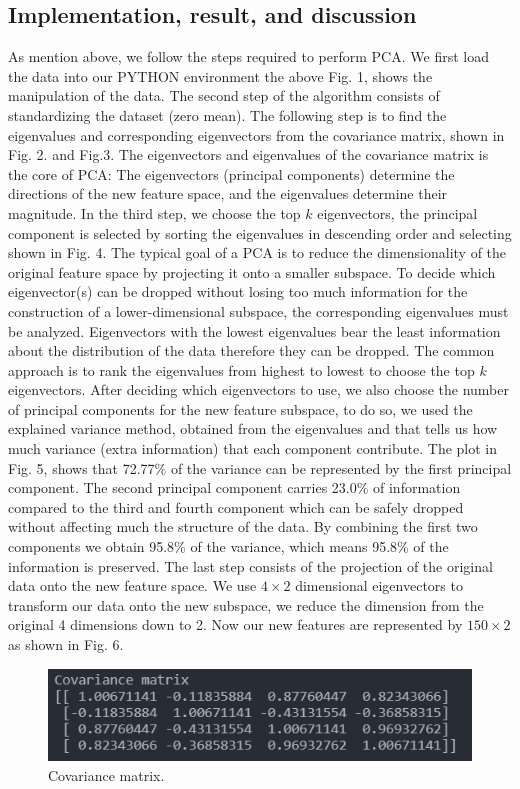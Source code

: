 \documentclass[conference]{IEEEtran}
\begin{document}
\subsection{Implementation, result, and discussion}
As mention above, we follow the steps required to perform PCA. We first load the data into our PYTHON environment the above Fig. 1, shows the manipulation of the data. 
The second step of the algorithm consists of standardizing the dataset (zero mean). The following step is to find the eigenvalues and corresponding eigenvectors from the covariance matrix, shown in Fig. 2. and Fig.3. The eigenvectors and eigenvalues of the covariance matrix is the core of PCA: The eigenvectors (principal components) determine the directions of the new feature space, and the eigenvalues determine their magnitude.
In the third step, we choose the top $k$ eigenvectors, the principal component is selected by sorting the eigenvalues in descending order and selecting shown in Fig. 4. The typical goal of a PCA is to reduce the dimensionality of the original feature space by projecting it onto a smaller subspace. To decide which eigenvector(s) can be dropped without losing too much information for the construction of a lower-dimensional subspace, the corresponding eigenvalues must be analyzed. Eigenvectors with the lowest eigenvalues bear the least information about the distribution of the data therefore they can be dropped. The common approach is to rank the eigenvalues from highest to lowest to choose the top $k$ eigenvectors. After deciding which eigenvectors to use, we also choose the number of principal components for the new feature subspace, to do so, we used the explained variance method, obtained from the eigenvalues and that tells us how much variance (extra information) that each component contribute. The plot in Fig. 5, shows that 72.77\% of the variance can be represented by the first principal component. The second principal component carries 23.0\% of information compared to the third and fourth component which can be safely dropped without affecting much the structure of the data. By combining the first two components we obtain 95.8\% of the variance, which means 95.8\% of the information is preserved. 
The last step consists of the projection of the original data onto the new feature space. We use $4\times2$ dimensional eigenvectors to transform our data onto the new subspace, we reduce the dimension from the original 4 dimensions down to 2. Now our new features are represented by $150\times2$ as shown in Fig. 6.
\begin{figure}[h]
\centerline{\includegraphics[scale=0.7]{Covariance Matrix.png}}
\caption{Covariance matrix.}
\label{fig}
\end{figure}
\end{document}
